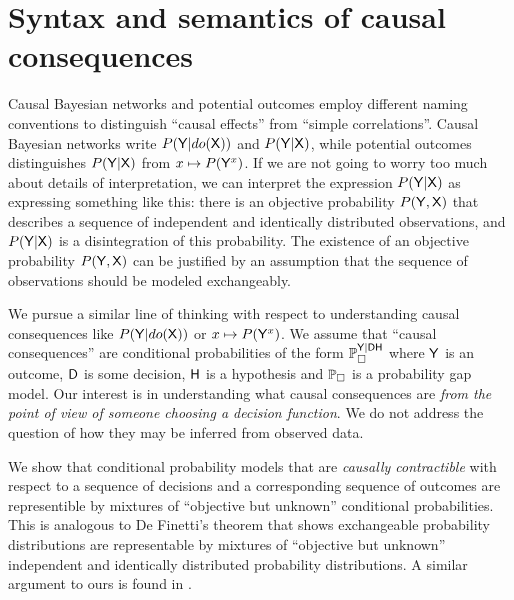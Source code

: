 


\section{Syntax and semantics of causal consequences}

Causal Bayesian networks and potential outcomes employ different naming conventions to distinguish ``causal effects'' from ``simple correlations''. Causal Bayesian networks write $P(\mathsf{Y}|do(\mathsf{X}))$ and $P(\mathsf{Y}|\mathsf{X})$, while potential outcomes distinguishes $P(\mathsf{Y}|\mathsf{X})$ from $x\mapsto P(\mathsf{Y}^x)$. If we are not going to worry too much about details of interpretation, we can interpret the expression $P(\mathsf{Y}|\mathsf{X})$ as expressing something like this: there is an objective probability $P(\mathsf{Y},\mathsf{X})$ that describes a sequence of independent and identically distributed observations, and $P(\mathsf{Y}|\mathsf{X})$ is a disintegration of this probability. The existence of an objective probability $P(\mathsf{Y},\mathsf{X})$ can be justified by an assumption that the sequence of observations should be modeled exchangeably.

We pursue a similar line of thinking with respect to understanding causal consequences like $P(\mathsf{Y}|do(\mathsf{X}))$ or $x\mapsto P(\mathsf{Y}^x)$. We assume that ``causal consequences'' are conditional probabilities of the form $\mathbb{P}_\square^{\mathsf{Y}|\mathsf{D}\mathsf{H}}$ where $\mathsf{Y}$ is an outcome, $\mathsf{D}$ is some decision, $\mathsf{H}$ is a hypothesis and $\mathbb{P}_\square$ is a probability gap model. Our interest is in understanding what causal consequences are \emph{from the point of view of someone choosing a decision function}. We do not address the question of how they may be inferred from observed data.

 We show that conditional probability models that are \emph{causally contractible} with respect to a sequence of decisions and a corresponding sequence of outcomes are representible by mixtures of ``objective but unknown'' conditional probabilities. This is analogous to De Finetti's theorem that shows exchangeable probability distributions are representable by mixtures of ``objective but unknown'' independent and identically distributed probability distributions. A similar argument to ours is found in \citet{dawid_decision-theoretic_2020}.

